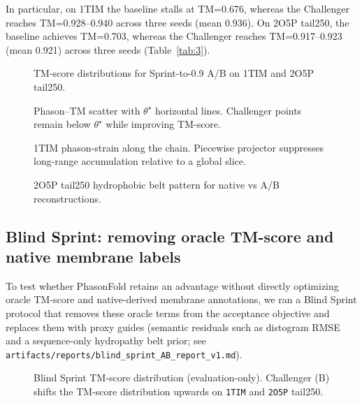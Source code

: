 In particular, on 1TIM the baseline stalls at TM=0.676, whereas the Challenger reaches TM=0.928--0.940 across three seeds (mean 0.936). On 2O5P tail250, the baseline achieves TM=0.703, whereas the Challenger reaches TM=0.917--0.923 (mean 0.921) across three seeds (Table~\ref{tab:3}).

\begin{figure}[t]
  \centering
  \caption{TM-score distributions for Sprint-to-0.9 A/B on 1TIM and 2O5P tail250.}
  \label{fig:9}
\end{figure}

\begin{figure}[t]
  \centering
  \caption{Phason–TM scatter with $\theta^\star$ horizontal lines. Challenger points remain below $\theta^\star$ while improving TM-score.}
  \label{fig:10}
\end{figure}

\begin{figure}[t]
  \centering
  \caption{1TIM phason-strain along the chain. Piecewise projector suppresses long-range accumulation relative to a global slice.}
  \label{fig:11}
\end{figure}

\begin{figure}[t]
  \centering
  \caption{2O5P tail250 hydrophobic belt pattern for native vs A/B reconstructions.}
  \label{fig:12}
\end{figure}

\subsection{Blind Sprint: removing oracle TM-score and native membrane labels}

To test whether PhasonFold retains an advantage without directly optimizing oracle TM-score and native-derived membrane annotations, we ran a Blind Sprint protocol that removes these oracle terms from the acceptance objective and replaces them with proxy guides (semantic residuals such as distogram RMSE and a sequence-only hydropathy belt prior; see \texttt{artifacts/reports/blind\_sprint\_AB\_report\_v1.md}).

\begin{table}[t]
  \centering
  \caption{Blind Sprint A/B summary (evaluation TM-score reported; not used for acceptance).}
  \label{tab:4}
\end{table}

\begin{figure}[t]
  \centering
  \caption{Blind Sprint TM-score distribution (evaluation-only). Challenger (B) shifts the TM-score distribution upwards on \texttt{1TIM} and \texttt{2O5P} tail250.}
  \label{fig:13}
\end{figure}
